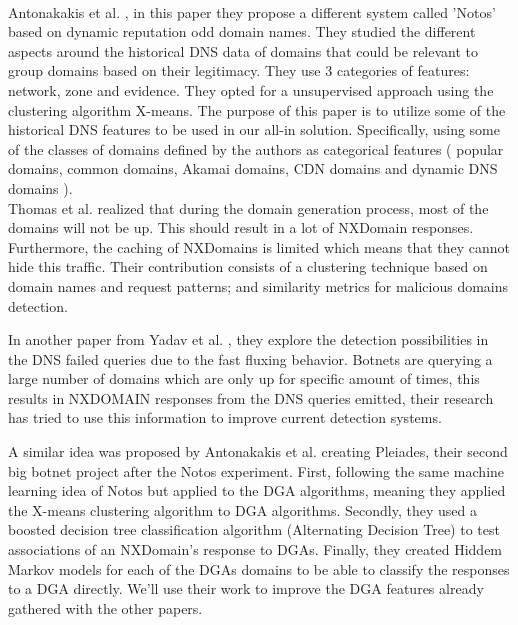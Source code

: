 \\
Antonakakis et al. \cite{dnsreputation}, in this paper they propose a different system called 'Notos' based on dynamic reputation odd domain names. They studied the different aspects around the historical DNS data of domains that could be relevant to group domains based on their legitimacy. They use 3 categories of features: network, zone and evidence. They opted for a unsupervised approach using the clustering algorithm X-means. The purpose of this paper is to utilize some of the historical DNS features to be used in our all-in solution. Specifically, using some of the classes of domains defined by the authors as categorical features ( popular domains, common domains, Akamai domains,  CDN domains and dynamic DNS domains ).
\\
Thomas et al. \cite{dga4} realized that during the domain generation process, most of the domains will not be up. This should result in a lot of NXDomain responses. Furthermore, the caching of NXDomains is limited which means that they cannot hide this traffic. Their contribution consists of a clustering technique based on domain names and request patterns; and similarity metrics for malicious domains detection.

In another paper from Yadav et al. \cite{dnsfailure}, they explore the detection possibilities in the DNS failed queries due to the fast fluxing behavior. Botnets are querying a large number of domains which are only up for specific amount of times, this results in NXDOMAIN responses from the DNS queries emitted, their research has tried to use this information to improve current detection systems.

A similar idea was proposed by Antonakakis et al. \cite{pleiades} creating Pleiades, their second big botnet project after the Notos experiment. First, following the same machine learning idea of Notos but applied to the DGA algorithms, meaning they applied the X-means clustering algorithm to DGA algorithms. Secondly, they used a boosted decision tree classification algorithm (Alternating Decision Tree) to test associations of an NXDomain's response to  DGAs. Finally, they created Hiddem Markov models for each of the DGAs domains to be able to classify the responses to a DGA directly. We'll use their work to improve the DGA features already gathered with the other papers.


